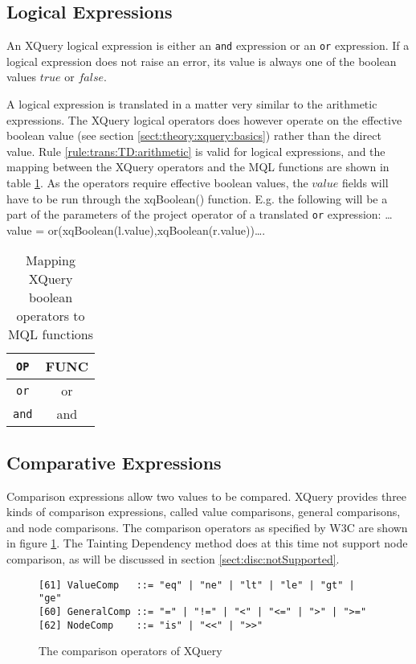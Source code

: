 \subsection{Logical Expressions}
\label{sect:trans:TD:logical}
An XQuery logical expression is either an \texttt{and} expression or an \texttt{or} expression. If a logical
expression does not raise an error, its value is always one of the boolean values $true$ or $false$.

A logical expression is translated in a matter very similar to the arithmetic expressions. The XQuery logical
operators does however operate on the effective boolean value (see section \ref{sect:theory:xquery:basics}) rather
than the direct value. Rule \ref{rule:trans:TD:arithmetic} is valid for logical expressions, and the mapping
between the XQuery operators and the MQL functions are shown in table \ref{tab:trans:TD:logMap}. As the operators
require effective boolean values, the $value$ fields will have to be run through the \textsf{xqBoolean()}
function. E.g. the following will be a part of the parameters of the \textsf{project} operator of a translated
\texttt{or} expression: \textsf{\ldots value = or(xqBoolean(l.value),xqBoolean(r.value))\ldots}.

\begin{table}[h]
\centering
\begin{tabular}{c|c}
\texttt{OP} & \textsf{FUNC} \\ \hline
\texttt{or} & \textsf{or} \\
\texttt{and} & \textsf{and} \\
\end{tabular}
\label{tab:trans:TD:logMap}
\caption{Mapping XQuery boolean operators to MQL functions}
\end{table}

\subsection{Comparative Expressions}
\label{sect:trans:TD:compArit}
Comparison expressions allow two values to be compared. XQuery provides three kinds of comparison expressions,
called value comparisons, general comparisons, and node comparisons. The comparison operators as specified by W3C
are shown in figure \ref{fig:trans:TD:compEBNF}. The Tainting Dependency method does at this time not support node
comparison, as will be discussed in section \ref{sect:disc:notSupported}.

\begin{figure}[h]
\begin{Verbatim}
[61] ValueComp   ::= "eq" | "ne" | "lt" | "le" | "gt" | "ge"
[60] GeneralComp ::= "=" | "!=" | "<" | "<=" | ">" | ">="
[62] NodeComp    ::= "is" | "<<" | ">>"
\end{Verbatim}
\caption{The comparison operators of XQuery \cite{w3c00}}
\label{fig:trans:TD:compEBNF}
\end{figure}

